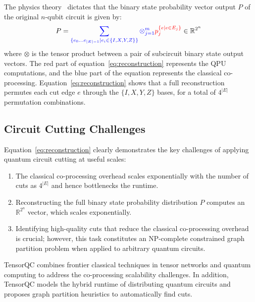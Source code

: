 The physics theory~\cite{peng2020simulating} dictates that the binary state probability vector output $P$ of the original $n$-qubit circuit is given by:
\begin{equation}
    P=\textcolor{blue}{\sum_{\{e_0\ldots e_{|E|-1}|e_i\in\{I,X,Y,Z\}\}}\otimes_{j=1}^{m}}\textcolor{red}{p_j^{\{e|e\in E_j\}}}\in\mathbb{R}^{2^n}\label{eq:reconstruction}
\end{equation}
where $\otimes$ is the tensor product between a pair of subcircuit binary state output vectors.
The red part of equation~\ref{eq:reconstruction} represents the QPU computations,
and the blue part of the equation represents the classical co-processing.
Equation~\ref{eq:reconstruction} shows that a full reconstruction permutes each cut edge $e$ through the $\{I,X,Y,Z\}$ bases,
for a total of $4^{|E|}$ permutation combinations.

\subsection{Circuit Cutting Challenges}
Equation~\ref{eq:reconstruction} clearly demonstrates the key challenges of applying quantum circuit cutting at useful scales:

\begin{enumerate}
    \item The classical co-processing overhead scales exponentially with the number of cuts as $4^{|E|}$ and hence bottlenecks the runtime.
    \item Reconstructing the full binary state probability distribution $P$ computes an $\mathbb{R}^{2^n}$ vector,
    which scales exponentially.
    \item Identifying high-quality cuts that reduce the classical co-processing overhead is crucial;
    however, this task constitutes an NP-complete constrained graph partition problem when applied to arbitrary quantum circuits.
\end{enumerate}

TensorQC combines frontier classical techniques in tensor networks and quantum computing to address the co-processing scalability challenges.
In addition, TensorQC models the hybrid runtime of distributing quantum circuits and proposes graph partition heuristics to automatically find cuts.